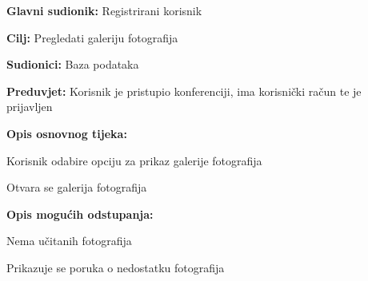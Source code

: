 					\noindent {}
					\begin{packed_item}
						
						\item \textbf{Glavni sudionik: }Registrirani korisnik
						\item  \textbf{Cilj:} Pregledati galeriju fotografija
						\item  \textbf{Sudionici:} Baza podataka
						\item  \textbf{Preduvjet:} Korisnik je pristupio konferenciji, ima korisnički račun te je prijavljen
						\item  \textbf{Opis osnovnog tijeka:}
						
						\item[] \begin{packed_enum}
							
							\item Korisnik odabire opciju za prikaz galerije fotografija
							\item Otvara se galerija fotografija
						\end{packed_enum}
						
						\item  \textbf{Opis mogućih odstupanja:}
						
						\item[] \begin{packed_item}
							\item[2.a] Nema učitanih fotografija
							\item[] \begin{packed_enum}			
								\item Prikazuje se poruka o nedostatku fotografija
							\end{packed_enum}
						\end{packed_item}
					\end{packed_item}
					

